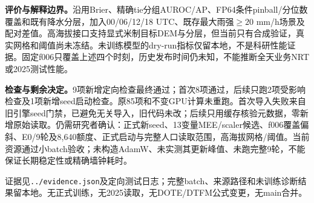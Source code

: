\documentclass[UTF8,10pt]{ctexart}
\begin{document}
\textbf{评价与解释边界。}沿用Brier、精确tie分组AUROC/AP、FP64条件pinball/分位数覆盖和既有降水分层，加入00/06/12/18 UTC、既存最大雨强$\ge20$ mm/h场景及配对差值。高海拔接口支持显式米制目标DEM与分层，但当前只有合成验证，真实网格和阈值尚未冻结。未训练模型的dry-run指标仅留本地，不是科研性能证据。固定f006只覆盖上述四个时刻，历史发布时间仍未知，不能推断全天业务NRT或2025测试性能。

\textbf{检查与剩余决定。}9项新增定向检查最终通过；首次8项通过，后续只跑2项受影响检查及1项新增seed启动检查。原85项和不变GPU计算未重跑。首次导入失败来自旧引擎seed门禁，已避免无关导入，旧代码未改；后续只用缓存核验元数据，零新增原始读取。仍需研究者确认：正式新seed、13变量MEE/scaler候选、f006覆盖偏斜、E0/9轮及8,640额度、正式启动与完整人口读取范围，高海拔网格/阈值。当前资源通过小batch验收；未构造AdamW、未实测其更新峰值、未跑完整9轮，不能保证长期稳定性或精确墙钟耗时。

证据见\texttt{../evidence.json}及定向测试日志；完整batch、来源路径和未训练诊断结果留本地。无正式训练，无2025读取，无DOTE/DTFM公式变更，无main合并。
\end{document}
